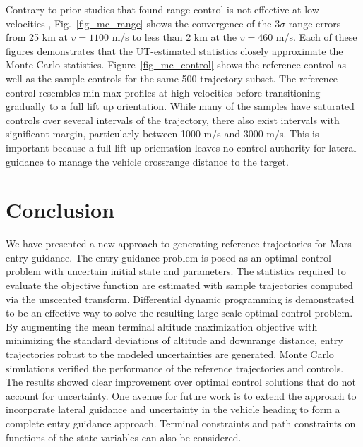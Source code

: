 \documentclass[journal ]{new-aiaa}
\begin{document}
Contrary to prior studies that found range control is not effective at low velocities \cite{MSL_EDL2}, Fig.~\ref{fig_mc_range} shows the convergence of the 3$\sigma$ range errors from 25 km at $ v=1100 $ m/s to less than 2 km at the $v=460$ m/s. Each of these figures demonstrates that the UT-estimated statistics closely approximate the Monte Carlo statistics. Figure~\ref{fig_mc_control} shows the reference control as well as the sample controls for the same 500 trajectory subset. The reference control resembles min-max profiles at high velocities before transitioning gradually to a full lift up orientation. While many of the samples have saturated controls over several intervals of the trajectory, there also exist intervals with significant margin, particularly between 1000 m/s and 3000 m/s. This is important because a full lift up orientation leaves no control authority for lateral guidance to manage the vehicle crossrange distance to the target.

\section*{Conclusion}
We have presented a new approach to generating reference trajectories for Mars entry guidance. The entry guidance problem is posed as an optimal control problem with uncertain initial state and parameters. The statistics required to evaluate the objective function are estimated with sample trajectories computed via the unscented transform. Differential dynamic programming is demonstrated to be an effective way to solve the resulting large-scale optimal control problem. By augmenting the mean terminal altitude maximization objective with minimizing the standard deviations of altitude and downrange distance, entry trajectories robust to the modeled uncertainties are generated. Monte Carlo simulations verified the performance of the reference trajectories and controls. The results showed clear improvement over optimal control solutions that do not account for uncertainty. 
One avenue for future work is to extend the approach to incorporate lateral guidance and uncertainty in the vehicle heading to form a complete entry guidance approach. Terminal constraints and path constraints on functions of the state variables can also be considered.
\end{document}
